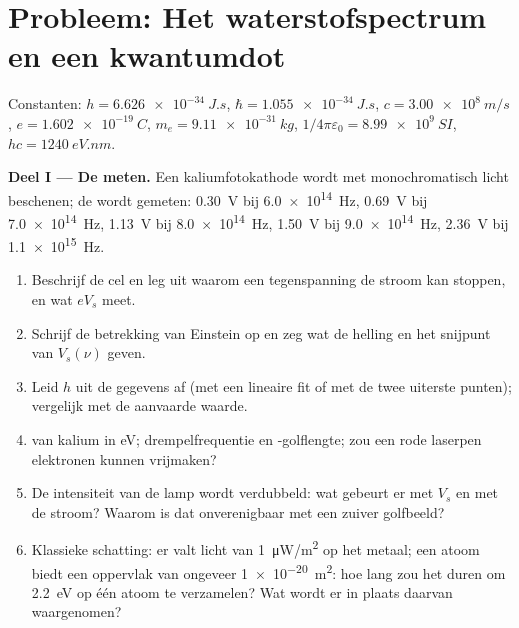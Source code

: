 \section{Probleem: Het waterstofspectrum en een kwantumdot}

\begin{problem}
\label{pb:b1:quantum-introduction:1}
Constanten: $h = \qty{6.626e-34}{J.s}$, $\hbar = \qty{1.055e-34}{J.s}$, $c =
\qty{3.00e8}{m/s}$, $e = \qty{1.602e-19}{C}$, $m_e = \qty{9.11e-31}{kg}$,
$1/4\pi\varepsilon_0 = \qty{8.99e9}{SI}$, $hc = \qty{1240}{eV.nm}$.

\medskip
\noindent\textbf{Deel I --- De  meten.}
Een kaliumfotokathode wordt met monochromatisch licht beschenen; de
 wordt gemeten: \qty{0.30}{V} bij \qty{6.0e14}{Hz}, \qty{0.69}{V} bij
\qty{7.0e14}{Hz}, \qty{1.13}{V} bij \qty{8.0e14}{Hz}, \qty{1.50}{V} bij
\qty{9.0e14}{Hz}, \qty{2.36}{V} bij \qty{1.1e15}{Hz}.
\begin{enumerate}
  \item Beschrijf de cel en leg uit waarom een tegenspanning de stroom
        kan stoppen, en wat $eV_s$ meet.
  \item Schrijf de betrekking van Einstein op en zeg wat de helling en het
        snijpunt van $V_s(\nu)$ geven.
  \item Leid $h$ uit de gegevens af (met een lineaire fit of met de twee
        uiterste punten); vergelijk met de aanvaarde waarde.
  \item {} van kalium in eV; drempelfrequentie en
        -golflengte; zou een rode laserpen elektronen kunnen vrijmaken?
  \item De intensiteit van de lamp wordt verdubbeld: wat gebeurt er met $V_s$ en met de
        stroom? Waarom is dat onverenigbaar met een zuiver golfbeeld?
  \item Klassieke schatting: er valt licht van \qty{1}{\micro W/m^2} op het
        metaal; een atoom biedt een oppervlak van ongeveer \qty{1e-20}{m^2}: hoe lang
        zou het duren om \qty{2.2}{eV} op één atoom te verzamelen? Wat wordt er
        in plaats daarvan waargenomen?
\end{enumerate}


\end{problem}
